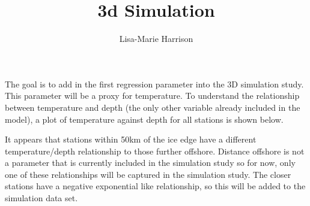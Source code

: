 \documentclass{article}
\begin{document}

\title{3d Simulation}
\author{Lisa-Marie Harrison}
\maketitle

The goal is to add in the first regression parameter into the 3D simulation study. 
This parameter will be a proxy for temperature. To understand the relationship between
temperature and depth (the only other variable already included in the model), a
plot of temperature against depth for all stations is shown below.


It appears that stations within 50km of the ice edge have a different temperature/depth
relationship to those further offshore. Distance offshore is not a parameter that
is currently included in the simulation study so for now, only one of these relationships
will be captured in the simulation study. The closer stations have a negative 
exponential like relationship, so this will be added to the simulation data set.
\end{document}
